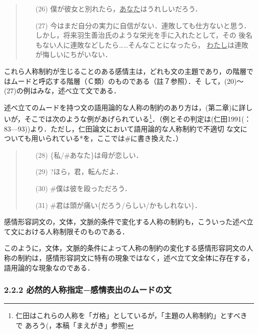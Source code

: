 \vspace{0.3cm}
\begin{quote}
\begin{itemize}
 \item[(26)] 僕が彼女と別れたら，\underline{あなた}はうれしいだろう．
 \item[(27)] 今はまだ自分の実力に自信がない．連敗しても仕方ないと思う．
	     しかし，将来羽生善治氏のような栄光を手に入れたとして，その
	     後名もない人に連敗などしたら……そんなことになったら，
	     \underline{わたし}は連敗が悔しいにちがいない．
\end{itemize}
\end{quote}
\vspace{0.3cm}

これら人称制約が生じることのある感情主は，どれも文の主題であり，\cite{南1993}の階層ではムードと呼応する階層（Ｃ類）のものである（註７参照）．そ
して，(20)〜(27)の例はみな，述べ立て文である．

述べ立てのムードを持つ文の語用論的な人称の制約のあり方は，\cite{仁田1991}(第二章)に詳しいが，そこでは次のような例があげられている\footnote
{仁田はこれらの人称を「ガ格」としているが，「主題の人称制約」とすべきで
あろう(\cite{東1997}，本稿「まえがき」参照)}．（例とその判定は(仁田1991(：83—93))より．ただし，仁田論文において語用論的な人称制約で不適切
な文についても用いられている*を，ここでは\#に書き換えた．）

\vspace{0.3cm}
\begin{quote}
\begin{itemize}
 \item[(28)] \{私/\#あなた\}は母が恋しい．
 \item[(29)] ?ほら，君，転んだよ．
 \item[(30)] \#僕は彼を殴っただろう．
 \item[(31)] \#君は頭が痛い\{だろう/らしい/かもしれない\}．
\end{itemize}
\end{quote}
\vspace{0.3cm}

感情形容詞文の，文体，文脈的条件で変化する人称の制約も，こういった述べ立
て文における人称制限そのものである．

このように，文体，文脈的条件によって人称の制約の変化する感情形容詞文の人
称の制約は，感情形容詞文に特有の現象ではなく，述べ立て文全体に存在する，
語用論的な現象なのである．

\subsubsection{2.2.2 必然的人称指定−感情表出のムードの文}

